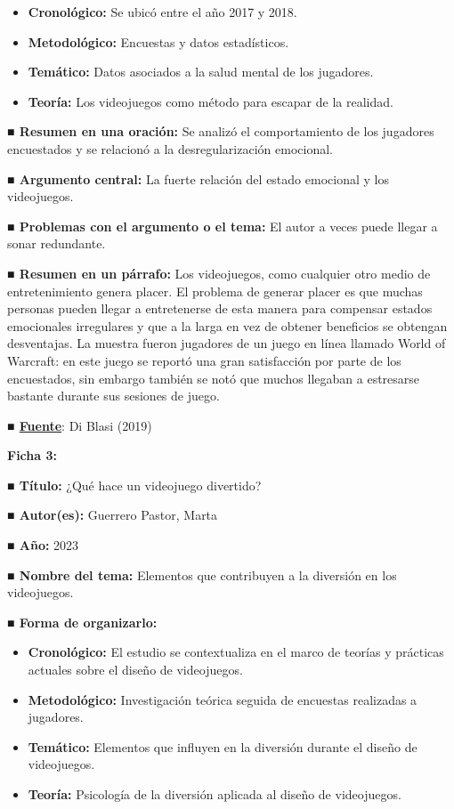 \documentclass[
  letterpaper,
  DIV=11,
  numbers=noendperiod]{scrreprt}
\begin{document}
\begin{itemize}
\item
  \textbf{Cronológico:} Se ubicó entre el año 2017 y 2018.
\item
  \textbf{Metodológico:} Encuestas y datos estadísticos.
\item
  \textbf{Temático:} Datos asociados a la salud mental de los jugadores.
\item
  \textbf{Teoría:} Los videojuegos como método para escapar de la
  realidad.
\end{itemize}

\textbf{■ Resumen en una oración:} Se analizó el comportamiento de los
jugadores encuestados y se relacionó a la desregularización emocional.

\textbf{■ Argumento central:} La fuerte relación del estado emocional y
los videojuegos.

\textbf{■ Problemas con el argumento o el tema:} El autor a veces puede
llegar a sonar redundante.

\textbf{■ Resumen en un párrafo:} Los videojuegos, como cualquier otro
medio de entretenimiento genera placer. El problema de generar placer es
que muchas personas pueden llegar a entretenerse de esta manera para
compensar estados emocionales irregulares y que a la larga en vez de
obtener beneficios se obtengan desventajas. La muestra fueron jugadores
de un juego en línea llamado World of Warcraft: en este juego se reportó
una gran satisfacción por parte de los encuestados, sin embargo también
se notó que muchos llegaban a estresarse bastante durante sus sesiones
de juego.

\textbf{■
\href{https://www.ncbi.nlm.nih.gov/pmc/articles/PMC7044601/}{Fuente}}:
Di Blasi (2019)

\textbf{Ficha 3:}

\textbf{■ Título:} ¿Qué hace un videojuego divertido?

\textbf{■ Autor(es):} Guerrero Pastor, Marta

\textbf{■ Año:} 2023

\textbf{■ Nombre del tema:} Elementos que contribuyen a la diversión en
los videojuegos.

\textbf{■ Forma de organizarlo:}

\begin{itemize}
\item
  \textbf{Cronológico:} El estudio se contextualiza en el marco de
  teorías y prácticas actuales sobre el diseño de videojuegos.
\item
  \textbf{Metodológico:} Investigación teórica seguida de encuestas
  realizadas a jugadores.
\item
  \textbf{Temático:} Elementos que influyen en la diversión durante el
  diseño de videojuegos.
\item
  \textbf{Teoría:} Psicología de la diversión aplicada al diseño de
  videojuegos.
\end{itemize}
\end{document}
